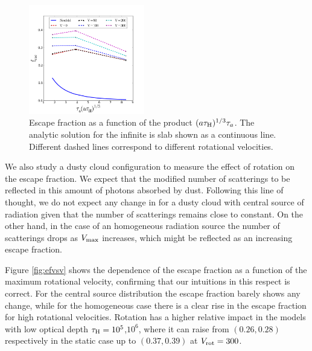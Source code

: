 \documentclass[usenatbib]{mn2e}
\newcommand{\ly}{{\ifmmode{{\rm Ly}\alpha~}\else{Ly$\alpha$~}\fi}}
\newcommand{\kms}{{\ifmmode{{\mathrm{\,km\ s}^{-1}}}\else{\,km~s$^{-1}$}\fi}}
\begin{document}
\begin{figure}
  \includegraphics[width=0.45\textwidth]{Neufeld.png}
 \caption{Escape fraction as a function of the
   product $(a\tau_{\rm H})^{1/3}\tau_{a}$. The analytic solution for
   the infinite is slab shown as a continuous line. Different dashed
   lines correspond to different rotational velocities.
   \label{fig:efvsNeufeld}}   
\end{figure}

We also study a dusty cloud configuration to measure the effect of
rotation on the escape fraction. We expect that the modified number of
scatterings to be reflected in this amount of photons absorbed by
dust. Following this line of thought,  we do not expect any change in
for a dusty cloud with central source of radiation given that the
number of scatterings remains close to constant. On the other hand, in
the case of an homogeneous radiation source the number of scatterings
drops as $V_{\rm max}$ increases, which might be reflected as an
increasing escape fraction.



Figure \ref{fig:efvsv} shows the dependence of the escape fraction as
a function of the maximum rotational velocity, confirming that our
intuitions in this respect is correct. For the central source
distribution the escape fraction barely shows any change, while for
the homogeneous case there is a clear rise in the escape fraction for
high rotational velocities.  Rotation has a higher relative impact in
the models with low optical depth $\tau_{\rm H}=10^5$,$10^{6}$, where
it can raise from $(0.26, 0.28)$ respectively in the static case up to $(0.37, 0.39)$ at $V_{\rm
  rot}=300$\kms. 
\end{document}
